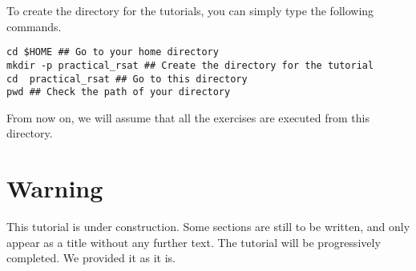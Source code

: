 To create the directory for the tutorials, you can simply type the
following commands.

{\color{Blue} \begin{footnotesize}
\begin{verbatim}
cd $HOME ## Go to your home directory
mkdir -p practical_rsat ## Create the directory for the tutorial
cd  practical_rsat ## Go to this directory
pwd ## Check the path of your directory
\end{verbatim} \end{footnotesize}
}

From now on, we will assume that all the exercises are executed
from this directory.


\section{Warning}

This tutorial is under construction. Some sections are still to be
written, and only appear as a title without any further text. The
tutorial will be progressively completed. We provided it as it is.
